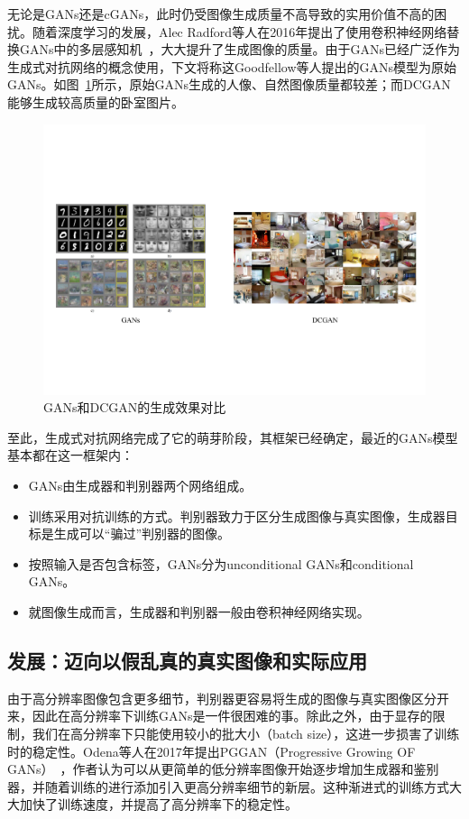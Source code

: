 无论是GANs还是cGANs，此时仍受图像生成质量不高导致的实用价值不高的困扰。随着深度学习的发展，Alec Radford等人在2016年提出了使用卷积神经网络替换GANs中的多层感知机~\cite{DCGAN}，大大提升了生成图像的质量。由于GANs已经广泛作为生成式对抗网络的概念使用，下文将称这Goodfellow等人提出的GANs模型为原始GANs。如图~\ref{fig:GAN-DCGAN}所示，原始GANs生成的人像、自然图像质量都较差；而DCGAN能够生成较高质量的卧室图片。

\begin{figure}
    \centering
    \includegraphics[width=\textwidth]{figures/GAN-DCGAN.pdf}
    \caption{GANs和DCGAN的生成效果对比}
    \label{fig:GAN-DCGAN}
\end{figure}

至此，生成式对抗网络完成了它的萌芽阶段，其框架已经确定，最近的GANs模型基本都在这一框架内：

\begin{itemize}
\item GANs由生成器和判别器两个网络组成。
\item 训练采用对抗训练的方式。判别器致力于区分生成图像与真实图像，生成器目标是生成可以“骗过”判别器的图像。
\item 按照输入是否包含标签，GANs分为unconditional GANs和conditional GANs。
\item 就图像生成而言，生成器和判别器一般由卷积神经网络实现。
\end{itemize}

\subsection{发展：迈向以假乱真的真实图像和实际应用}
由于高分辨率图像包含更多细节，判别器更容易将生成的图像与真实图像区分开来，因此在高分辨率下训练GANs是一件很困难的事。除此之外，由于显存的限制，我们在高分辨率下只能使用较小的批大小（batch size），这进一步损害了训练时的稳定性。Odena等人在2017年提出PGGAN（Progressive Growing OF GANs）~\cite{PGGAN}，作者认为可以从更简单的低分辨率图像开始逐步增加生成器和鉴别器，并随着训练的进行添加引入更高分辨率细节的新层。这种渐进式的训练方式大大加快了训练速度，并提高了高分辨率下的稳定性。

